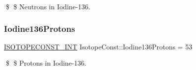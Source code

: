 \$ \$ Neutrons in Iodine-\/136. \mbox{\label{group___isotope_const-_iodine-_i136_gada7093d15bdf8ea56ef7735583c23e11}} 
\subsubsection{\texorpdfstring{Iodine136\+Protons}{Iodine136Protons}}
{\footnotesize\ttfamily \mbox{\hyperlink{group___isotope_const-_macros_ga5f18360b3e99483a35c32d789e62621c}{I\+S\+O\+T\+O\+P\+E\+C\+O\+N\+S\+T\+\_\+\+I\+NT}} Isotope\+Const\+::\+Iodine136\+Protons = 53}

\$ \$ Protons in Iodine-\/136. 